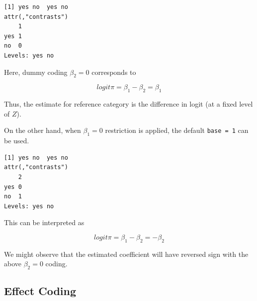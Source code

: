 \documentclass[]{book}
\newenvironment{Shaded}{\begin{snugshade}}{\end{snugshade}}
\newcommand{\DataTypeTok}[1]{\textcolor[rgb]{0.13,0.29,0.53}{#1}}
\newcommand{\DecValTok}[1]{\textcolor[rgb]{0.00,0.00,0.81}{#1}}
\newcommand{\KeywordTok}[1]{\textcolor[rgb]{0.13,0.29,0.53}{\textbf{#1}}}
\newcommand{\NormalTok}[1]{#1}
\newcommand{\OperatorTok}[1]{\textcolor[rgb]{0.81,0.36,0.00}{\textbf{#1}}}
\newcommand{\StringTok}[1]{\textcolor[rgb]{0.31,0.60,0.02}{#1}}
\begin{document}
\begin{Shaded}
\end{Shaded}

\begin{verbatim}
[1] yes no  yes no 
attr(,"contrasts")
    1
yes 1
no  0
Levels: yes no
\end{verbatim}

Here, dummy coding \(\beta_2 = 0\) corresponds to

\[logit\pi = \beta_1 - \beta_2 = \beta_1\]

Thus, the estimate for reference category is the difference in logit (at a fixed level of \(Z\)).

On the other hand, when \(\beta_1 = 0\) restriction is applied, the default \texttt{base\ =\ 1} can be used.

\begin{Shaded}
\end{Shaded}

\begin{verbatim}
[1] yes no  yes no 
attr(,"contrasts")
    2
yes 0
no  1
Levels: yes no
\end{verbatim}

This can be interpreted as

\[logit\pi = \beta_1 - \beta_2 = -\beta_2\]

We might observe that the estimated coefficient will have reversed sign with the above \(\beta_2 = 0\) coding.

\hypertarget{effect-coding}{%
\subsection{Effect Coding}\label{effect-coding}}
\end{document}
